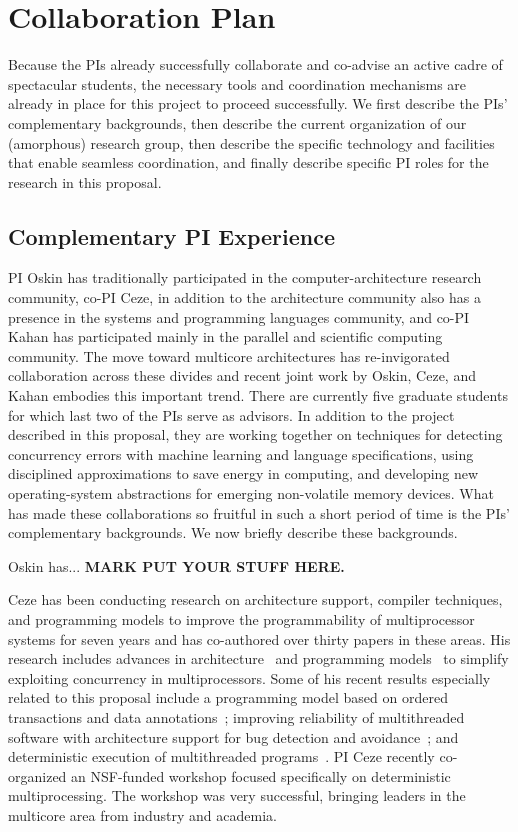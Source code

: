 \newpage
\section*{Collaboration Plan}

Because the PIs already successfully collaborate and co-advise an
active cadre of spectacular students, the necessary tools and
coordination mechanisms are already in place for this project to
proceed successfully.  We first describe the PIs' complementary
backgrounds, then describe the current organization of our (amorphous)
research group, then describe the specific technology and facilities
that enable seamless coordination, and finally describe specific PI roles
for the research in this proposal.

\subsection*{Complementary PI Experience}

PI Oskin has traditionally participated in the computer-architecture research
community, co-PI Ceze, in addition to the architecture community also has a
presence in the systems and programming languages community, and co-PI Kahan
has participated mainly in the parallel and scientific computing community.
The move toward multicore architectures has re-invigorated collaboration
across these divides and recent joint work by Oskin, Ceze, and Kahan
embodies this important trend. There are currently five graduate students for
which last two of the PIs serve as advisors. In addition to the project
described in this proposal, they are working together on techniques for
detecting concurrency errors with machine learning and language
specifications, using disciplined approximations to save energy in computing,
and developing new operating-system abstractions for emerging non-volatile
memory devices. What has made these collaborations so fruitful in such a short
period of time is the PIs' complementary backgrounds. We now briefly describe
these backgrounds.

Oskin has... {\bf MARK PUT YOUR STUFF HERE.}

Ceze has been conducting research on architecture support, compiler
techniques, and programming models to improve the programmability of
multiprocessor systems for seven years and has co-authored over thirty
papers in these areas.  His research includes advances in
architecture~\cite{tlsooo, bulk, bulksc, swbulk, cyclops, dmp,
  delorean} and programming models~\cite{colorama, ipot, posh} to
simplify exploiting concurrency in multiprocessors. Some of his recent
results especially related to this proposal include a programming
model based on ordered transactions and data annotations~\cite{ipot};
improving reliability of multithreaded software with architecture
support for bug detection and avoidance~\cite{atomaid, aatoppicks,
  bugaboo, oshajava, cs-isca10, ce-isca10}; and deterministic
execution of multithreaded programs~\cite{dmp, dmptoppicks,
  asplos10coredet, dmpos}. PI Ceze recently co-organized an NSF-funded
workshop focused specifically on deterministic multiprocessing. The
workshop was very successful, bringing leaders in the multicore area
from industry and academia.

